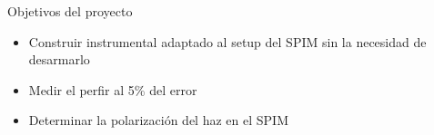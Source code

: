 \begin{frame}{Objetivos del proyecto}
    \begin{itemize}
        \item Construir instrumental adaptado al setup del SPIM sin la necesidad de desarmarlo
        \item Medir el perfir al 5\% del error
        \item Determinar la polarización del haz en el SPIM
    \end{itemize}
\end{frame}
